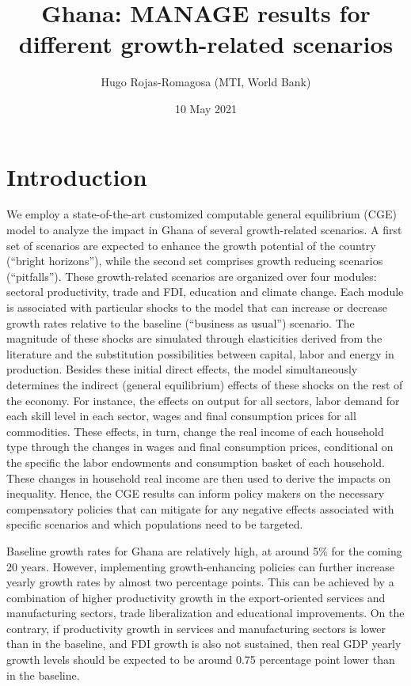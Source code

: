\documentclass[11pt,english]{article}
\begin{document}
\title{Ghana: MANAGE results for different growth-related scenarios}
\author{Hugo Rojas-Romagosa (MTI, World Bank)}
\date{10 May 2021}
\maketitle

\section{Introduction}

We employ a state-of-the-art customized computable general equilibrium (CGE) model to analyze the impact in Ghana of several growth-related scenarios. A first set of scenarios are expected to enhance the growth potential of the country (``bright horizons''), while the second set comprises growth reducing scenarios (``pitfalls''). These growth-related scenarios are organized over four modules: sectoral productivity, trade and FDI, education and climate change. Each module is associated with particular shocks to the model that can increase or decrease growth rates relative to the baseline (``business as usual'') scenario. The magnitude of these shocks are simulated through elasticities derived from the literature and the substitution possibilities between capital, labor and energy in production. Besides these initial direct effects, the model simultaneously determines the indirect (general equilibrium) effects of these shocks on the rest of the economy. For instance, the effects on output for all sectors, labor demand for each skill level in each sector, wages and final consumption prices for all commodities. These effects, in turn, change the real income of each household type through the changes in wages and final consumption prices, conditional on the specific the labor endowments and consumption basket of each household. These changes in household real income are then used to derive the impacts on inequality.  Hence, the CGE results can inform policy makers on the necessary compensatory policies that can mitigate for any negative effects associated with specific scenarios and which populations need to be targeted.  


Baseline growth rates for Ghana are relatively high, at around 5\% for the coming 20 years. However, implementing growth-enhancing policies can further increase yearly growth rates by almost two percentage points. This can be achieved by a combination of higher productivity growth in the export-oriented services and manufacturing sectors, trade liberalization and educational improvements. On  the contrary, if productivity growth in services and manufacturing sectors is lower than in the baseline, and FDI growth is also not sustained, then real GDP yearly growth levels should be expected to be around 0.75 percentage point lower than in the baseline. 
\end{document}
